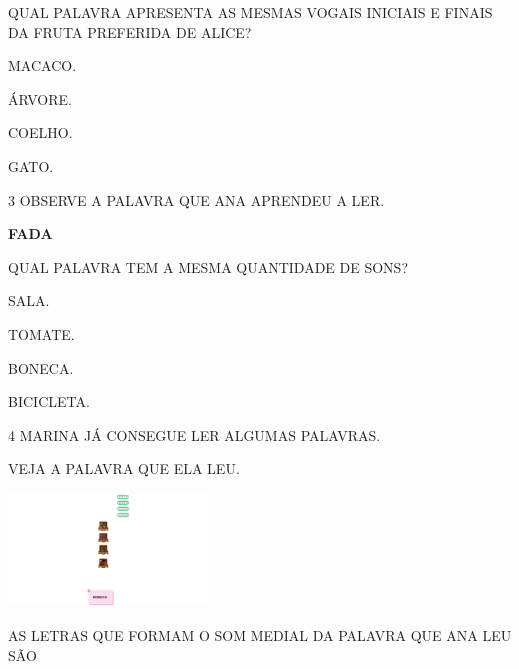QUAL PALAVRA APRESENTA AS MESMAS VOGAIS INICIAIS E FINAIS DA FRUTA PREFERIDA DE ALICE?

\begin{escolha}
\item MACACO.

\item ÁRVORE.

\item COELHO.

\item GATO.
\end{escolha}




\num{3} OBSERVE A PALAVRA QUE ANA APRENDEU A LER.

\textbf{FADA}

QUAL PALAVRA TEM A MESMA QUANTIDADE DE SONS?

\begin{escolha}
\item SALA.

\item TOMATE.

\item BONECA.

\item BICICLETA.
\end{escolha}




\num{4} MARINA JÁ CONSEGUE LER ALGUMAS PALAVRAS.

VEJA A PALAVRA QUE ELA LEU.

\includegraphics[width=2.07917in,height=1.19306in]{media/image213.png}

AS LETRAS QUE FORMAM O SOM MEDIAL DA PALAVRA QUE ANA LEU SÃO

